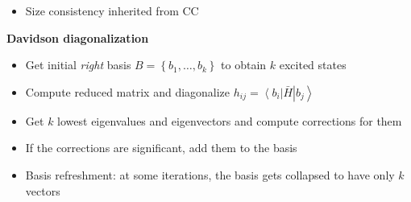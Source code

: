 \documentclass[a0paper,portrait]{baposter}
\begin{document}
\begin{poster}
{\begin{itemize}
    \item
      Size consistency inherited from CC

  \end{itemize}

  \textbf{Davidson diagonalization}
  \begin{itemize}

    \item
      Get initial \textit{right} basis
      $ B = \left \{ b_{1}, \ldots, b_{k} \right \} $
      to obtain $ k $ excited states

    \item
      Compute reduced matrix and diagonalize
      $
        h_{ij} =
        \left \langle b_{i} \right | \bar H \left | b_{j} \right \rangle
      $

    \item
      Get $ k $ lowest eigenvalues and eigenvectors and compute corrections
      for them

    \item
      If the corrections are significant, add them to the basis

    \item
      Basis refreshment: at some iterations, the basis gets collapsed
      to have only $ k $ vectors

  \end{itemize}




}



\end{poster}
\end{document}
